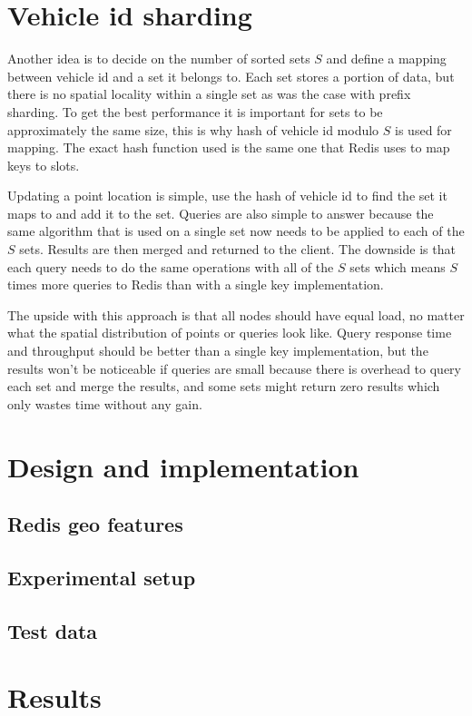 \documentclass[times, utf8, diplomski]{fer}
\begin{document}

\chapter {Vehicle id sharding}
Another idea is to decide on the number of sorted sets $S$ and define a mapping between vehicle id and a set it belongs to. Each set stores a portion of data, but there is no spatial locality within a single set as was the case with prefix sharding. To get the best performance it is important for sets to be approximately the same size, this is why hash of vehicle id modulo $S$ is used for mapping. The exact hash function used is the same one that Redis uses to map keys to slots.

Updating a point location is simple, use the hash of vehicle id to find the set it maps to and add it to the set. Queries are also simple to answer because the same algorithm that is used on a single set now needs to be applied to each of the $S$ sets. Results are then merged and returned to the client. The downside is that each query needs to do the same operations with all of the $S$ sets which means $S$ times more queries to Redis than with a single key implementation.

The upside with this approach is that all nodes should have equal load, no matter what the spatial distribution of points or queries look like. Query response time and throughput should be better than a single key implementation, but the results won't be noticeable if queries are small because there is overhead to query each set and merge the results, and some sets might return zero results which only wastes time without any gain.

\chapter {Design and implementation}
\section {Redis geo features}
\section {Experimental setup}
\section {Test data}

\chapter {Results}
\end{document}
